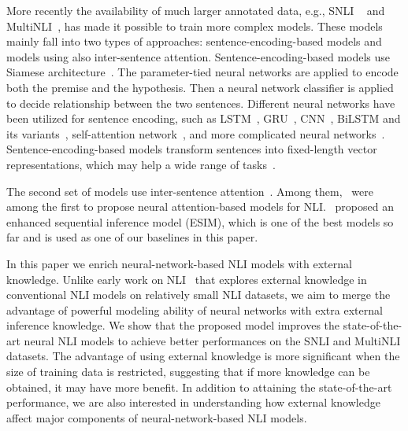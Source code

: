 \documentclass[11pt,a4paper]{article}
\begin{document}
More recently the availability of much larger annotated data, e.g., SNLI ~\citep{DBLP:conf/emnlp/BowmanAPM15} and MultiNLI~\citep{DBLP:journals/corr/WilliamsNB17}, has made it possible to train more complex models. These models mainly fall into two types of approaches: sentence-encoding-based models and models using also inter-sentence attention. Sentence-encoding-based models use Siamese architecture~\citep{DBLP:conf/nips/BromleyGLSS93}. The parameter-tied neural networks are applied to encode both the premise and the hypothesis. Then a neural network classifier is applied to decide relationship between the two sentences. Different neural networks have been utilized for sentence encoding, such as LSTM~\citep{DBLP:conf/emnlp/BowmanAPM15}, GRU~\citep{DBLP:journals/corr/VendrovKFU15}, CNN~\citep{DBLP:conf/acl/MouMLX0YJ16}, BiLSTM and its variants~\citep{DBLP:journals/corr/LiuSLW16,DBLP:journals/corr/LinFSYXZB17,DBLP:conf/repeval/ChenZLWJI17,DBLP:conf/repeval/NieB17}, self-attention network~\citep{DBLP:journals/corr/abs-1709-04696,DBLP:journals/corr/abs-1801-10296}, and more complicated neural networks~\citep{DBLP:conf/acl/BowmanGRGMP16,DBLP:conf/eacl/YuM17a,DBLP:conf/eacl/YuM17,DBLP:journals/corr/ChoiYL17}. 
Sentence-encoding-based models transform sentences into fixed-length vector representations, which may help a wide range of tasks~\citep{DBLP:conf/emnlp/ConneauKSBB17}. 

The second set of models use inter-sentence attention~\citep{DBLP:journals/corr/RocktaschelGHKB15,DBLP:conf/naacl/WangJ16,DBLP:conf/emnlp/0001DL16,DBLP:conf/emnlp/ParikhT0U16,DBLP:conf/acl/ChenZLWJI17}. Among them,~\citet{DBLP:journals/corr/RocktaschelGHKB15} were among the first to propose neural attention-based models for NLI.~\citet{DBLP:conf/acl/ChenZLWJI17} proposed an enhanced sequential inference model (ESIM), which is one of the best models so far and is used as one of our baselines in this paper.

In this paper we enrich neural-network-based NLI models with external knowledge. Unlike early work on NLI~\citep{Jijkoun2005RecognizingTE, DBLP:conf/emnlp/MacCartneyGM08,MacCartneyThesis} that explores external knowledge in conventional NLI models on relatively small NLI datasets, we aim to merge the advantage of powerful modeling ability of neural networks with extra external inference knowledge. We show that the proposed model improves the state-of-the-art neural NLI models to achieve better performances on the SNLI and MultiNLI datasets. The advantage of using external knowledge is more significant when the size of training data is restricted, suggesting that if more knowledge can be obtained, it may have more benefit. In addition to attaining the state-of-the-art performance, we are also interested in understanding how external knowledge affect major components of neural-network-based NLI models.
\end{document}
